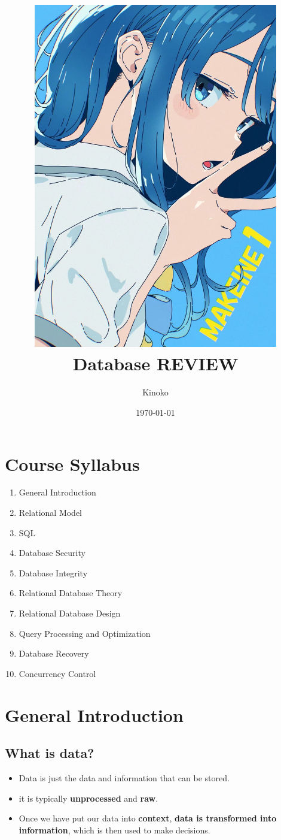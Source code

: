 \documentclass[a4paper, 12pt]{article}
\title{
    \includegraphics[width=0.8\textwidth]{Yanami_ep1.JPG}\\  %
    Database REVIEW
}
\author{Kinoko}
\date{\today}
\begin{document}

\begin{titlepage}  
    \maketitle
\end{titlepage}

\fancyhead[R]{}  %

\tableofcontents
\newpage  %


\section*{Course Syllabus}  %
    \begin{center}
        \begin{enumerate}
        \renewcommand{\labelenumi}{\Roman{enumi}.}  %
        \item General Introduction
        \item Relational Model
        \item SQL
        \item Database Security
        \item Database Integrity
        \item Relational Database Theory 
        \item Relational Database Design
        \item Query Processing and Optimization
        \item Database Recovery
        \item Concurrency Control
    \end{enumerate}
    \end{center}
    

\newpage

\setcounter{section}{0}

\section{General Introduction}
    \subsection{What is data?}
        \begin{itemize}
            \item Data is just the data and information that can be stored.
            \item it is typically \textbf{unprocessed} and \textbf{raw}.
            \item Once we have put our data into \textbf{context}, \textbf{data is transformed into information}, which
            is then used to make decisions.
        \end{itemize}
    
\end{document}
